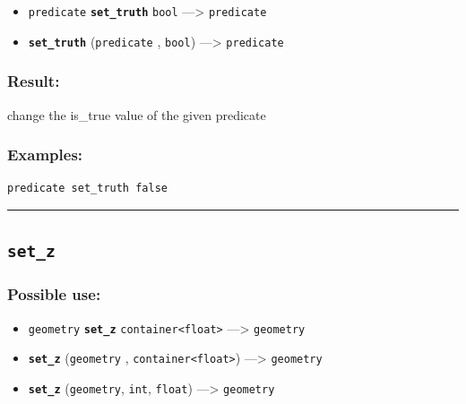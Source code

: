 \documentclass[]{book}
\providecommand{\tightlist}{%
  \setlength{\itemsep}{0pt}\setlength{\parskip}{0pt}}
\theoremstyle{definition}
\theoremstyle{definition}
\theoremstyle{definition}
\theoremstyle{remark}
\begin{document}
\begin{itemize}
\tightlist
\item
  \texttt{predicate} \textbf{\texttt{set\_truth}} \texttt{bool}
  ---\textgreater{} \texttt{predicate}
\item
  \textbf{\texttt{set\_truth}} (\texttt{predicate} , \texttt{bool})
  ---\textgreater{} \texttt{predicate}
\end{itemize}

\subsubsection{Result:}\label{result-452}

change the is\_true value of the given predicate

\subsubsection{Examples:}\label{examples-325}

\begin{verbatim}
predicate set_truth false 
\end{verbatim}

\begin{center}\rule{0.5\linewidth}{\linethickness}\end{center}

\subsection{\texorpdfstring{\texttt{set\_z}}{set\_z}}\label{set_z}

\subsubsection{Possible use:}\label{possible-use-469}

\begin{itemize}
\tightlist
\item
  \texttt{geometry} \textbf{\texttt{set\_z}}
  \texttt{container\textless{}float\textgreater{}} ---\textgreater{}
  \texttt{geometry}
\item
  \textbf{\texttt{set\_z}} (\texttt{geometry} ,
  \texttt{container\textless{}float\textgreater{}}) ---\textgreater{}
  \texttt{geometry}
\item
  \textbf{\texttt{set\_z}} (\texttt{geometry}, \texttt{int},
  \texttt{float}) ---\textgreater{} \texttt{geometry}
\end{itemize}
\end{document}

